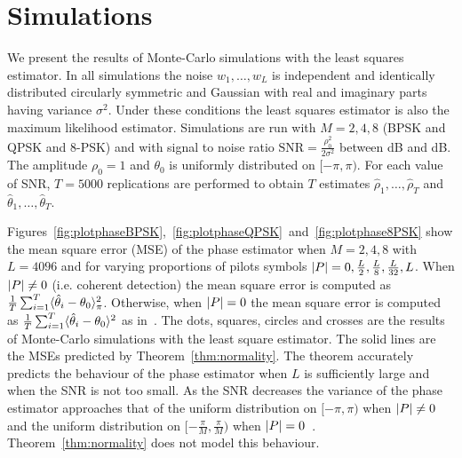 \documentclass[journal]{IEEEtran}
\begin{document}
\section{Simulations}\label{sec:simulations}

We present the results of Monte-Carlo simulations with the least squares estimator.  In all simulations the noise $w_1,\dots,w_L$ is independent and identically distributed circularly symmetric and Gaussian with real and imaginary parts having variance $\sigma^2$.  Under these conditions the least squares estimator is also the maximum likelihood estimator.  Simulations are run with $M=2,4,8$ (BPSK and QPSK and $8$-PSK) and with signal to noise ratio $\text{SNR} = \tfrac{\rho_0^2}{2\sigma^2}$ between \unit[-20]{dB} and \unit[20]{dB}.  The amplitude $\rho_0=1$ and $\theta_0$ is uniformly distributed on $[-\pi, \pi)$.  For each value of SNR, $T = 5000$ replications are performed to obtain $T$ estimates $\hat{\rho}_1, \dots, \hat{\rho}_T$ and $\hat{\theta}_1, \dots, \hat{\theta}_T$.  

Figures~\ref{fig:plotphaseBPSK},~\ref{fig:plotphaseQPSK}~and~\ref{fig:plotphase8PSK} show the mean square error (MSE) of the phase estimator when $M=2,4,8$ with $L=4096$ and for varying proportions of pilots symbols ${\left\vert P \right\vert} = 0, \tfrac{L}{2}, \tfrac{L}{8}, \tfrac{L}{32}, L$.  When ${\left\vert P \right\vert} \neq 0$ (i.e. coherent detection) the mean square error is computed as $\tfrac{1}{T}\sum_{i=1}^T\langle \hat{\theta}_i - \theta_0 \rangle_\pi^2$.  Otherwise, when ${\left\vert P \right\vert}=0$ the mean square error is computed as $\tfrac{1}{T}\sum_{i=1}^T\langle \hat{\theta}_i - \theta_0 \rangle^2$ as in~\cite{McKilliam_leastsqPSKnoncoICASSP_2012}.  The dots, squares, circles and crosses are the results of Monte-Carlo simulations with the least square estimator.  The solid lines are the MSEs predicted by Theorem~\ref{thm:normality}.  The theorem accurately predicts the behaviour of the phase estimator when $L$ is sufficiently large and when the SNR is not too small.  As the SNR decreases the variance of the phase estimator approaches that of the uniform distribution on $[-\pi, \pi)$ when ${\left\vert P \right\vert} \neq 0$ and the uniform distribution on $[-\tfrac{\pi}{M}, \tfrac{\pi}{M})$ when ${\left\vert P \right\vert}=0$~\cite{McKilliam_leastsqPSKnoncoICASSP_2012}.  Theorem~\ref{thm:normality} does not model this behaviour.
\end{document}

